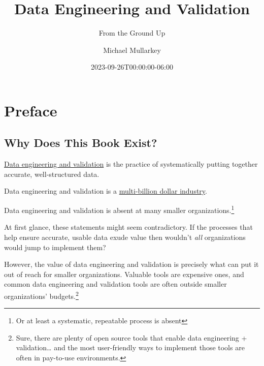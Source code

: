 \documentclass[
  letterpaper,
  DIV=11,
  numbers=noendperiod]{scrreprt}
\title{Data Engineering and Validation}
\subtitle{From the Ground Up}
\author{Michael Mullarkey}
\date{2023-09-26T00:00:00-06:00}
\renewcommand*\contentsname{Table of contents}
\newcommand\contentsname{Table of contents}
\begin{document}
\maketitle
\ifdefined\Shaded\renewenvironment{Shaded}{\begin{tcolorbox}[breakable, borderline west={3pt}{0pt}{shadecolor}, frame hidden, boxrule=0pt, interior hidden, sharp corners, enhanced]}{\end{tcolorbox}}\fi

\renewcommand*\contentsname{Table of contents}
{
\hypersetup{linkcolor=}
\setcounter{tocdepth}{2}
\tableofcontents
}

\hypertarget{preface}{%
\chapter*{Preface}\label{preface}}

\hypertarget{why-does-this-book-exist}{%
\section*{Why Does This Book Exist?}\label{why-does-this-book-exist}}

\href{https://blog.pragmaticengineer.com/what-is-data-engineering/}{Data
engineering and validation} is the practice of systematically putting
together accurate, well-structured data.

Data engineering and validation is a
\href{https://finance.yahoo.com/news/big-data-engineering-services-market-125600472.html}{multi-billion
dollar industry}.

Data engineering and validation is absent at many smaller
organizations.\footnote{Or at least a systematic, repeatable process is
  absent}

At first glance, these statements might seem contradictory. If the
processes that help ensure accurate, usable data exude value then
wouldn't \emph{all} organizations would jump to implement them?

However, the value of data engineering and validation is precisely what
can put it out of reach for smaller organizations. Valuable tools are
expensive ones, and common data engineering and validation tools are
often outside smaller organizations' budgets.\footnote{Sure, there are
  plenty of open source tools that enable data engineering +
  validation\ldots{} and the most user-friendly ways to implement those
  tools are often in pay-to-use environments.}
\end{document}
